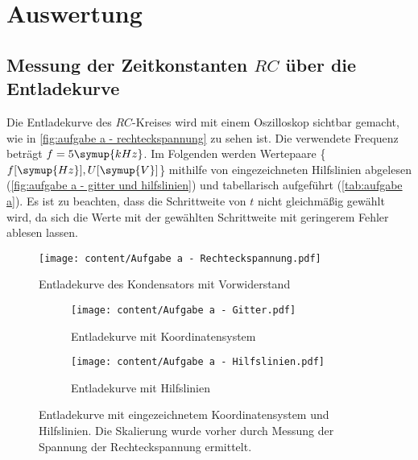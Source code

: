\section{Auswertung}
\label{sec:Auswertung}
\subsection{Messung der Zeitkonstanten $RC$ über die Entladekurve}
Die Entladekurve des $RC$-Kreises wird mit einem Oszilloskop sichtbar gemacht, wie 
in \autoref{fig:aufgabe a - rechteckspannung} zu sehen ist. Die verwendete Frequenz beträgt $f=5\symup{kHz}$.
Im Folgenden werden Wertepaare \{$f [\symup{Hz}], U [\symup{V}]$\} mithilfe von eingezeichneten Hilfslinien abgelesen
(\autoref{fig:aufgabe a - gitter und hilfslinien}) und tabellarisch aufgeführt (\autoref{tab:aufgabe a}). Es ist zu beachten,
dass die Schrittweite von $t$ nicht gleichmäßig gewählt wird, da sich die Werte mit der gewählten Schrittweite mit
geringerem Fehler ablesen lassen.

\begin{figure}
  \centering
  \texttt{[image: content/Aufgabe a - Rechteckspannung.pdf]}
  \caption{Entladekurve des Kondensators mit Vorwiderstand}
  \label{fig:aufgabe a - rechteckspannung}
\end{figure}

\begin{figure}
  \begin{subfigure}{0.48\textwidth}
    \centering
    \texttt{[image: content/Aufgabe a - Gitter.pdf]}
    \caption{Entladekurve mit Koordinatensystem}
    \label{fig:aufgabe a - gitter}
  \end{subfigure}
  \hfill
  \begin{subfigure}{0.48\textwidth}
    \centering
    \texttt{[image: content/Aufgabe a - Hilfslinien.pdf]}
    \caption{Entladekurve mit Hilfslinien}
    \label{fig:aufgabe a - hilfslinien}
  \end{subfigure}
  \caption{Entladekurve mit eingezeichnetem Koordinatensystem und Hilfslinien. Die %
    Skalierung wurde vorher durch Messung der Spannung der Rechteckspannung ermittelt.}
  \label{fig:aufgabe a - gitter und hilfslinien}
\end{figure}

